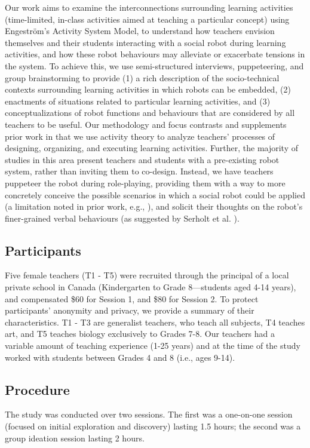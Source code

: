 Our work aims to examine the interconnections surrounding learning activities (time-limited, in-class activities aimed at teaching a particular concept) using Engeström's Activity System Model, to understand how teachers envision themselves and their students interacting with a social robot during learning activities, and how these robot behaviours may alleviate or exacerbate tensions in the system. To achieve this, we use semi-structured interviews, puppeteering, and group brainstorming to provide (1) a rich description of the socio-technical contexts surrounding learning activities in which robots can be embedded, (2) enactments of situations related to particular learning activities, and (3) conceptualizations of robot functions and behaviours that are considered by all teachers to be useful. Our methodology and focus contrasts and supplements prior work in that we use activity theory to analyze teachers' processes of designing, organizing, and executing learning activities. Further, the majority of studies in this area present teachers and students with a pre-existing robot system, rather than inviting them to co-design. Instead, we have teachers puppeteer the robot during role-playing, providing them with a way to more concretely conceive the possible scenarios in which a social robot could be applied (a limitation  noted  in  prior  work, e.g., \cite{van2020teachers,Ahmad2016}), and solicit their thoughts on the robot's finer-grained verbal behaviours (as suggested by Serholt et al. \cite{serholt2014teachers}).

\subsection{Participants}
\label{sec:7}
Five female teachers (T1 - T5) were recruited through the principal of a local private school in Canada (Kindergarten to Grade 8---students aged 4-14 years), and compensated \$60 for Session 1, and \$80 for Session 2. To protect participants' anonymity and privacy, we provide a summary of their characteristics. T1 - T3 are generalist teachers, who teach all subjects, T4 teaches art, and T5 teaches biology exclusively to Grades 7-8. Our teachers had a variable amount of teaching experience (1-25 years) and at the time of the study worked with students between Grades 4 and 8 (i.e., ages 9-14). 


\subsection{Procedure}
\label{sec:8}
The study was conducted over two sessions. The first was a one-on-one session (focused on initial exploration and discovery) lasting 1.5 hours; the second was a group ideation session lasting 2 hours.  
